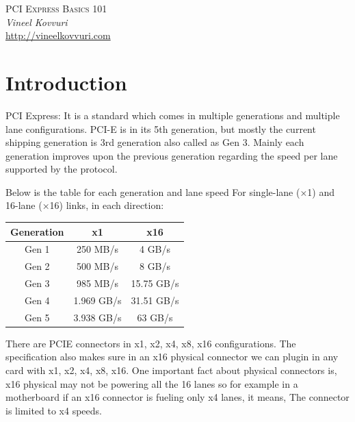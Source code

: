 \documentclass{article}
\begin{document}
\begin{titlepage}
   \begin{center}
      \Large\textsc{PCI Express Basics 101}\\
      \vspace{5mm}
      \Large\textit{Vineel Kovvuri}\\
      \url{http://vineelkovvuri.com}\\
   \end{center}
\end{titlepage}

\tableofcontents

\newpage
\section{Introduction}
PCI Express: It is a standard which comes in multiple generations
and multiple lane configurations. PCI-E is in its 5th generation,
but mostly the current shipping generation is 3rd generation also
called as Gen 3. Mainly each generation improves upon the previous
generation regarding the speed per lane supported by the protocol.

Below is the table for each generation and lane speed 
For single-lane (×1) and 16-lane (×16) links, in each direction:
\begin{center}
\begin{tabular}{|c|c|c|}
 Generation &x1         &x16          \\
 \hline
 Gen 1      &250 MB/s   &4 GB/s       \\
 Gen 2      &500 MB/s   &8 GB/s       \\
 Gen 3      &985 MB/s   &15.75 GB/s   \\
 Gen 4      &1.969 GB/s &31.51 GB/s   \\
 Gen 5      &3.938 GB/s &63 GB/s
\end{tabular}
\end{center}

There are PCIE connectors in x1, x2, x4, x8, x16 configurations.
The specification also makes sure in an x16 physical connector
we can plugin in any card with x1, x2, x4, x8, x16. One important fact
about physical connectors is, x16 physical may not be powering
all the 16 lanes so for example in a motherboard if an x16 connector
is fueling only x4 lanes, it means, The connector is limited to x4 speeds.
\end{document}
